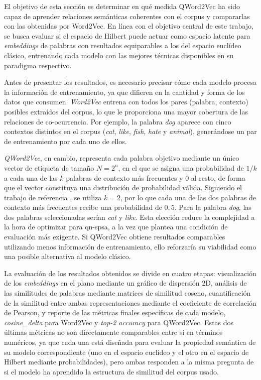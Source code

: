 El objetivo de esta sección es determinar en qué medida QWord2Vec ha sido capaz de aprender relaciones semánticas coherentes con el corpus y compararlas con las obtenidas por Word2Vec. En línea con el objetivo central de este trabajo, se busca evaluar si el espacio de Hilbert puede actuar como espacio latente para \textit{embeddings} de palabras con resultados equiparables a los del espacio euclídeo clásico, entrenando cada modelo con las mejores técnicas disponibles en su paradigma respectivo.

Antes de presentar los resultados, es necesario precisar cómo cada modelo procesa la información de entrenamiento, ya que difieren en la cantidad y forma de los datos que consumen. \textit{Word2Vec} entrena con todos los pares (palabra, contexto) posibles extraídos del corpus, lo que le proporciona una mayor cobertura de las relaciones de co-ocurrencia. Por ejemplo, la palabra \textit{dog} aparece con cinco contextos distintos en el corpus (\textit{cat}, \textit{like}, \textit{fish}, \textit{hate} y \textit{animal}), generándose un par de entrenamiento por cada uno de ellos.

\textit{QWord2Vec}, en cambio, representa cada palabra objetivo mediante un único vector de etiqueta de tamaño $N = 2^n$, en el que se asigna una probabilidad de $1/k$ a cada una de las $k$ palabras de contexto más frecuentes y $0$ al resto, de forma que el vector constituya una distribución de probabilidad válida. Siguiendo el trabajo de referencia \cite{ohno_qword2vec_2025}, se utiliza $k = 2$, por lo que cada una de las dos palabras de contexto más frecuentes recibe una probabilidad de $0{,}5$. Para la palabra \textit{dog}, las dos palabras seleccionadas serían \textit{cat} y \textit{like}. Esta elección reduce la complejidad a la hora de optimizar para \gls{qn-spsa}, a la vez que plantea una condición de evaluación más exigente. Si QWord2Vec obtiene resultados comparables utilizando menos información de entrenamiento, ello reforzaría su viabilidad como una posible alternativa al modelo clásico.

La evaluación de los resultados obtenidos se divide en cuatro etapas: visualización de los \textit{embeddings} en el plano mediante un gráfico de dispersión 2D, análisis de las similitudes de palabras mediante matrices de similitud coseno, cuantificación de la similitud entre ambas representaciones mediante el coeficiente de correlación de Pearson, y reporte de las métricas finales específicas de cada modelo, \textit{cosine\_delta} para Word2Vec y \textit{top-2 accuracy} para QWord2Vec. Estas dos últimas métricas no son directamente comparables entre sí en términos numéricos, ya que cada una está diseñada para evaluar la propiedad semántica de su modelo correspondiente (uno en el espacio euclídeo y el otro en el espacio de Hilbert mediante probabilidades), pero ambas responden a la misma pregunta de si el modelo ha aprendido la estructura de similitud del corpus usado.

